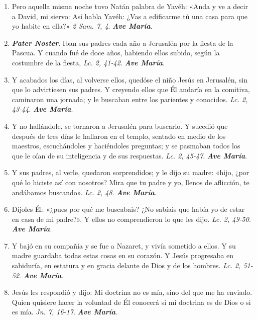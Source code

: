 \documentclass[../../devocionario.tex]{subfiles}
\begin{document}
    \begin{enumerate}
        \item Pero aquella misma noche tuvo Natán palabra de Yavéh: «Anda y ve a decir a David, mi siervo: Así habla Yavéh: ¿Vas a edificarme tú una casa
            para que yo habite en ella?» \textit{2 Sam. 7, 4}. \textbf{\textit{Ave María}}.

        \item \textbf{\textit{Pater Noster}}. Iban sus padres cada año a Jerusalén por la fiesta de la Pascua. 
            Y cuando fué de doce años, habiendo ellos subido, según la costumbre de la fiesta, \textit{Lc. 2, 41-42}. \textbf{\textit{Ave María}}.

        \item Y acabados los días, al volverse ellos, quedóse el niño Jesús en Jerusalén, sin que lo advirtiesen sus padres. 
            Y creyendo ellos que Él andaría en la comitiva, caminaron una jornada; y le buscaban entre los parientes y conocidos. 
            \textit{Lc. 2, 43-44}. \textbf{\textit{Ave María}}.

        \item Y no hallándole, se tornaron a Jerusalén para buscarlo. Y sucedió que después de tres días le hallaron en el templo, 
            sentado en medio de los maestros, escuchándoles y haciéndoles preguntas; y se pasmaban todos los que le oían de su inteligencia 
            y de sus respuestas. \textit{Lc. 2, 45-47}. \textbf{\textit{Ave María}}.

        \item Y sus padres, al verle, quedaron sorprendidos; y le dijo su madre: «hijo, ¿por qué lo hiciste así con nosotros? 
            Mira que tu padre y yo, llenos de aflicción, te andábamos buscando». \textit{Lc. 2, 48}. \textbf{\textit{Ave María}}.

        \item Díjoles Él: «¿pues por qué me buscabais? ¿No sabíais que había yo de estar en casa de mi padre?». Y ellos no comprendieron lo que les dijo. 
            \textit{Lc. 2, 49-50}. \textbf{\textit{Ave María}}.

        \item Y bajó en su compañía y se fue a Nazaret, y vivía sometido a ellos. Y su madre guardaba todas estas cosas en su corazón. 
            Y Jesús progresaba en sabiduría, en estatura y en gracia delante de Dios y de los hombres. \textit{Lc. 2, 51-52}. \textbf{\textit{Ave María}}.

        \item Jesús les respondió y dijo: Mi doctrina no es mía, sino del que me ha enviado. Quien quisiere hacer la voluntad de Él conocerá si mi doctrina
            es de Dios o si es mía. \textit{Jn. 7, 16-17}. \textbf{\textit{Ave María}}.


\end{enumerate}
\end{document}
